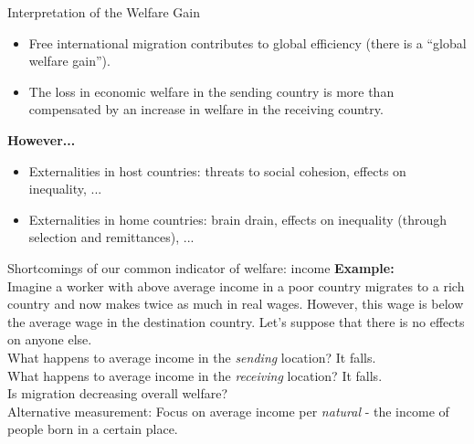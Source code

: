 \documentclass{beamer}
\begin{document}
\begin{frame}{Interpretation of the Welfare Gain}
    \begin{itemize} \small
        \item Free international migration contributes to global efficiency (there is a “global welfare gain”).
        \item The loss in economic welfare in the sending country is more than compensated by an increase in welfare in the receiving country. 
        \end{itemize}
        \textbf{However...}
    \begin{itemize} \small
        \item Externalities in host countries: threats to social cohesion, effects on inequality, ...
        \item Externalities in home countries: brain drain, effects on inequality (through selection and remittances), ... %
    \end{itemize}
\end{frame}

\begin{frame}{Shortcomings of our common indicator of welfare: income}
\textbf{Example:} \\
Imagine a worker with above average income in a poor country migrates to a rich country and now makes twice as much in real wages. However, this wage is below the average wage in the destination country. Let's suppose that there is no effects on anyone else. \\
What happens to average income in the \textit{sending} location? \pause It falls. \\ \pause
What happens to average income in the \textit{receiving} location? \pause It falls. \\
Is migration decreasing overall welfare? \\ \pause %
Alternative measurement: Focus on average income per \textit{natural} - the income of people born in a certain place.
\end{frame}
\end{document}
